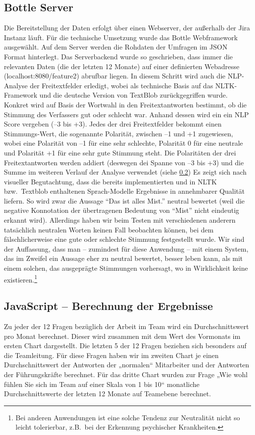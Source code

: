 \documentclass[a4paper,12pt,]{article}
\begin{document}
\subsection{Bottle Server}\label{Bottle}
Die Bereitstellung der Daten erfolgt über einen Webserver, der außerhalb der Jira Instanz läuft. Für die technische Umsetzung wurde das Bottle Webframework ausgewählt. Auf dem Server werden die Rohdaten der Umfragen im JSON Format hinterlegt. Das Serverbackend wurde so geschrieben, dass immer die relevanten Daten (die der letzten 12 Monate) auf einer definierten Webadresse (localhost:8080/feature2) abrufbar liegen. In diesem Schritt wird auch die NLP-Analyse der Freitextfelder erledigt, wobei als technische Basis auf das NLTK-Framework und die deutsche Version von TextBlob zurückgegriffen wurde. Konkret wird auf Basis der Wortwahl in den Freitextantworten bestimmt, ob die Stimmung des Verfassers gut oder schlecht war. Anhand dessen wird ein ein NLP Score vergeben (--3 bis +3). Jedes der drei Freitextfelder bekommt einen Stimmungs-Wert, die sogenannte Polarität, zwischen --1 und +1 zugewiesen, wobei eine Polarität von --1 für eine sehr schlechte, Polarität 0 für eine neutrale und Polarität +1 für eine sehr gute Stimmung steht. Die Polaritäten der drei Freitextantworten werden addiert (deswegen dei Spanne von --3 bis +3) und die Summe im weiteren Verlauf der Analyse verwendet (siehe \ref{berechnung}) Es zeigt sich nach visueller Begutachtung, dass die bereits implementierten und in NLTK bzw.~Textblob enthaltenen Sprach-Modelle Ergebnisse in annehmbarer Qualität liefern. So wird zwar die Aussage ``Das ist alles Mist.'' neutral bewertet (weil die negative Konnotation der übertragenen Bedeutung von ``Mist'' nicht eindeutig erkannt wird). Allerdings haben wir beim Testen mit verschiedenen anderern tatsächlich neutralen Worten keinen Fall beobachten können, bei dem fälschlicherweise eine gute oder schlechte Stimmung festgestellt wurde. Wir sind der Auffassung, dass man -- zumindest für diese Anwendung -- mit einem System, das im Zweifel ein Aussage eher zu neutral bewertet, besser leben kann, als mit einem solchen, das ausgeprägte Stimmungen vorhersagt, wo in Wirklichkeit keine existieren.\footnote{Bei anderen Anwendungen ist eine solche Tendenz zur Neutralität nicht so leicht tolerierbar, z.B.~bei der Erkennung psychischer Krankheiten.} 

\subsection{JavaScript – Berechnung der Ergebnisse}\label{berechnung}
Zu jeder der 12 Fragen bezüglich der Arbeit im Team wird ein Durchschnittswert pro Monat berechnet. Dieser wird zusammen mit dem Wert des Vormonats im ersten Chart dargestellt. 
Die letzten 5 der 12 Fragen beziehen sich besonders auf die Teamleitung. Für diese Fragen haben wir im zweiten Chart je einen Durchschnittswert der Antworten der „normalen“ Mitarbeiter und der Antworten der Führungskräfte berechnet. 
Für das dritte Chart wurden zur Frage „Wie wohl fühlen Sie sich im Team auf einer Skala von 1 bis 10“ monatliche Durchschnittswerte der letzten 12 Monate auf Teamebene berechnet. 
\end{document}
